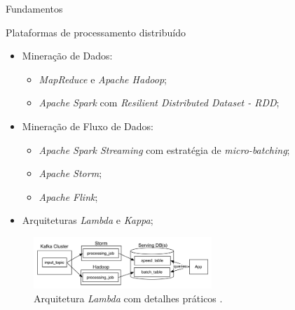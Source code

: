 \documentclass[aspectratio=43,10pt]{beamer}
\newcommand{\nota}[1]{\hspace*{-0.5cm}\textit{{\color[rgb]{1,0,0}Nota: #1}}}
\begin{document}
\begin{frame}[fragile]{Fundamentos}
\begin{alertblock}{Plataformas de processamento distribuído}
  \begin{itemize}
    \item Mineração de Dados:
    \begin{itemize}
      \item \emph{MapReduce} e \emph{Apache Hadoop};
      \item \emph{Apache Spark} com \emph{Resilient Distributed Dataset - RDD};
    \end{itemize}
    \item Mineração de Fluxo de Dados:
    \begin{itemize}
      \item \emph{Apache Spark Streaming} com estratégia de \emph{micro-batching};
      \item \emph{Apache Storm};
      \item \emph{Apache Flink};
    \end{itemize}
    \item Arquiteturas \emph{Lambda} e \emph{Kappa};
  \end{itemize}
\end{alertblock}
\begin{figure}[ht]
  \centering
  \includegraphics[width=0.6\textwidth]{figuras/lambda.png}
  \caption{Arquitetura \emph{Lambda} com detalhes práticos \cite{Kreps2014}.}
  \label{fig:lambda}
\end{figure}



\end{frame}
\end{document}
